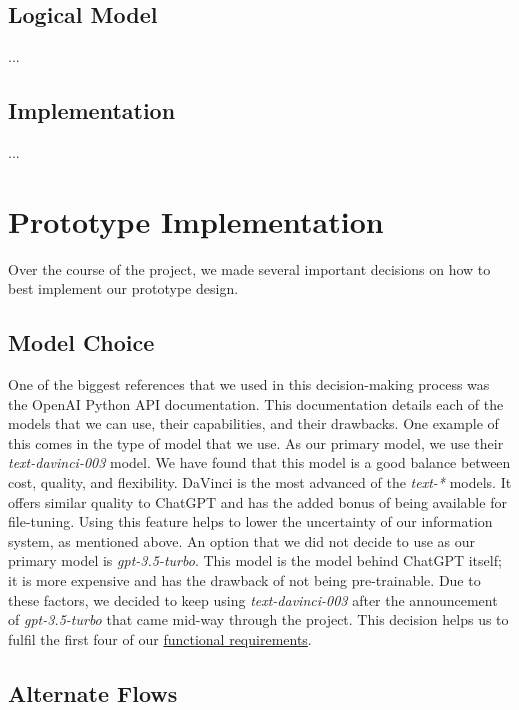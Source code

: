 \documentclass[12pt,a4paper]{article}
\begin{document}
    \subsection{Logical Model}
    ...

    \subsection{Implementation}
    ...

    \section{Prototype Implementation}

    Over the course of the project, we made several important decisions on how to best implement our
    prototype design.

    \subsection{Model Choice}

    One of the biggest references that we used in this decision-making process was
    the OpenAI Python API documentation\cite{openAiDocs}.  This documentation details
    each of the models that we can use, their capabilities, and their drawbacks.  One example of this
    comes in the type of model that we use.  As our primary model, we use their \textit{text-davinci-003}
    model.  We have found that this model is a good balance between cost, quality, and flexibility.
    DaVinci is the most advanced of the \textit{text-*} models.  It offers similar quality to ChatGPT
    and has the added bonus of being available for file-tuning.  Using this feature helps to lower
    the uncertainty of our information system, as mentioned above.  An option that we did not decide to
    use as our primary model is \textit{gpt-3.5-turbo}.  This model is the model behind ChatGPT itself;
    it is more expensive and has the drawback of not being pre-trainable.  Due to these factors, we
    decided to keep using \textit{text-davinci-003} after the announcement of \textit{gpt-3.5-turbo}
    that came mid-way through the project.  This decision helps us to fulfil the first four of our
    \hyperref[functionalReqs]{functional requirements}.

    \subsection{Alternate Flows}
\end{document}
